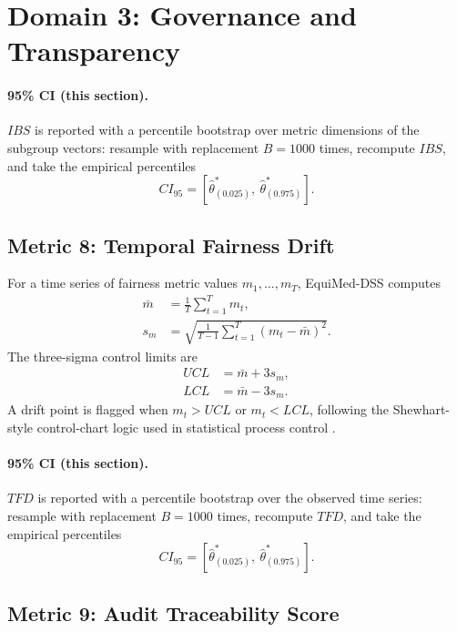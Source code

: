 \documentclass[11pt]{article}
\begin{document}
\section{Domain 3: Governance and Transparency}


\paragraph{95\% CI (this section).} $IBS$ is reported with a percentile bootstrap over metric dimensions of the subgroup vectors: resample with replacement $B=1000$ times, recompute $IBS$, and take the empirical percentiles
\begin{equation}
CI_{95}=\left[\hat\theta^{\ast}_{(0.025)},\ \hat\theta^{\ast}_{(0.975)}\right].
\end{equation}

\subsection{Metric 8: Temporal Fairness Drift}

For a time series of fairness metric values $m_1,\ldots,m_T$, EquiMed-DSS
computes
\begin{align}
\bar m &= \frac{1}{T}\sum_{t=1}^{T}m_t,\\
s_m &= \sqrt{\frac{1}{T-1}\sum_{t=1}^{T}(m_t-\bar m)^2}.
\end{align}
The three-sigma control limits are
\begin{align}
UCL &= \bar m+3s_m,\\
LCL &= \bar m-3s_m.
\end{align}
A drift point is flagged when $m_t>UCL$ or $m_t<LCL$, following the
Shewhart-style control-chart logic used in statistical process control
\cite{shewhart1931}.


\paragraph{95\% CI (this section).} $TFD$ is reported with a percentile bootstrap over the observed time series: resample with replacement $B=1000$ times, recompute $TFD$, and take the empirical percentiles
\begin{equation}
CI_{95}=\left[\hat\theta^{\ast}_{(0.025)},\ \hat\theta^{\ast}_{(0.975)}\right].
\end{equation}

\subsection{Metric 9: Audit Traceability Score}
\end{document}
